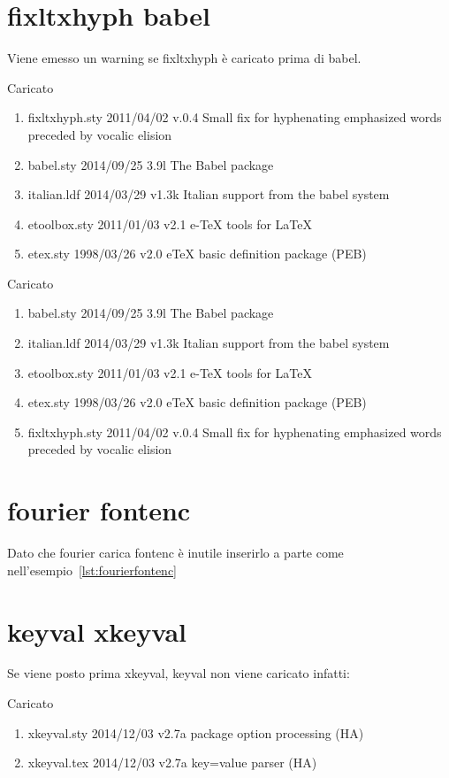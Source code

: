 \section{fixltxhyph babel}
Viene emesso un warning se fixltxhyph è caricato prima di babel. 

Caricato 
\begin{enumerate}
\item fixltxhyph.sty 2011/04/02 v.0.4 Small fix for hyphenating emphasized words preceded by vocalic elision
\item babel.sty 2014/09/25 3.9l The Babel package
\item italian.ldf 2014/03/29 v1.3k Italian support from the babel system
\item etoolbox.sty 2011/01/03 v2.1 e-TeX tools for LaTeX
\item etex.sty 1998/03/26 v2.0 eTeX basic definition package (PEB)
\end{enumerate}

Caricato 
\begin{enumerate}
\item babel.sty 2014/09/25 3.9l The Babel package
\item italian.ldf 2014/03/29 v1.3k Italian support from the babel system
\item etoolbox.sty 2011/01/03 v2.1 e-TeX tools for LaTeX
\item etex.sty 1998/03/26 v2.0 eTeX basic definition package (PEB)
\item fixltxhyph.sty 2011/04/02 v.0.4 Small fix for hyphenating emphasized words preceded by vocalic elision
\end{enumerate}
\section{fourier fontenc}
Dato che fourier carica fontenc è inutile inserirlo a parte come nell'esempio~\vref{lst:fourierfontenc}

\section{keyval xkeyval}
Se viene posto prima xkeyval, keyval non viene caricato infatti: 

Caricato 
\begin{enumerate}
\item xkeyval.sty  2014/12/03 v2.7a package option processing (HA)
\item xkeyval.tex 2014/12/03 v2.7a key=value parser (HA)
\end{enumerate}
